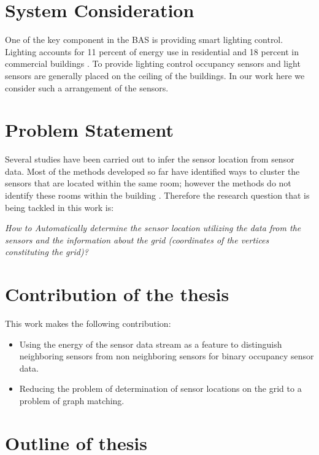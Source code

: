 \section{System Consideration}
One of the key component in the BAS is providing smart lighting control. Lighting accounts for 11 percent of energy use in residential and 18 percent in commercial buildings \cite{website}. To provide lighting control occupancy sensors and light sensors are generally placed on the ceiling of the buildings. In our work here we consider such a arrangement of the sensors.

\section{Problem Statement}

Several studies \cite{Hong:2013:TAS:2528282.2528302,doi:10.1061/9780784413616.226,Koc:2014:CLC:2674061.2674075,Lu:2014:SBS:2648771.2629441,ellis2012creating,muller2014automated,marinakis2005learning} have been carried out to infer the sensor location from sensor data. Most of the methods developed so far have identified ways to cluster the sensors that are located within the same room; however the methods do not identify these rooms within the building \cite{doi:10.1061/9780784413616.226}.  Therefore the research question that is being tackled in this work is:

\textit{How to Automatically determine the sensor location utilizing the data from the sensors and the information about the grid (coordinates of the vertices constituting the grid)?}

\section{Contribution of the thesis}
This work makes the following contribution:
\begin{itemize}
\item Using the energy of the sensor data stream as a feature to distinguish neighboring sensors from non neighboring sensors for binary occupancy sensor data.
\item Reducing the problem of determination of sensor locations  on the grid to a problem of graph matching.
\end{itemize}

\section{Outline of thesis}

